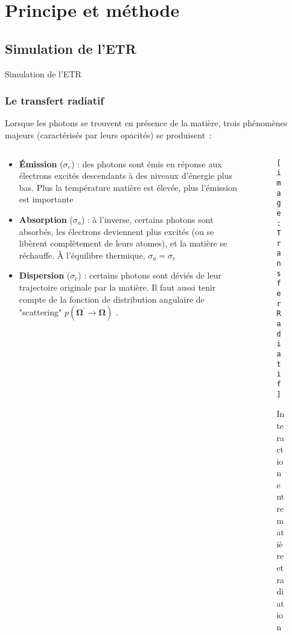 
% 


\section{Principe et méthode}

\subsection{Simulation de l'ETR}

\begin{frame}
  \large
  \centering
  Simulation de l'ETR
\end{frame}

\begin{frame}
  \frametitle{Le transfert radiatif}

  \scriptsize
Lorsque les photons se trouvent en présence de la matière, trois phénomènes majeurs (caractérisés par leurs opacités) se produisent :

\begin{columns}
  \begin{column}{0.55\textwidth}
    \scriptsize
   \begin{itemize}[<+>]
     \item \textbf{Émission} ($\sigma_e$) : des photons sont émis en réponse aux électrons excités descendants à des niveaux d’énergie plus bas. Plus la température matière est élevée, plus l'émission est importante %
     \item \textbf{Absorption} ($\sigma_a$) : à l’inverse, certains photons sont absorbés, les électrons deviennent plus excités (ou se libèrent complètement de leurs atomes), et la matière se réchauffe. À l'équilibre thermique, $\sigma_a = \sigma_e$ %
     \item \textbf{Dispersion} ($\sigma_c$) : certains photons sont déviés de
     leur trajectoire originale par la matière. Il faut aussi tenir compte de la fonction de distribution angulaire de "scattering" $p(\bm{\Omega^\prime \rightarrow \bm{\Omega}})$ \parencite{Reference3}.
   \end{itemize}
  \end{column}
  \begin{column}{0.45\textwidth}
     \begin{figure}       
      \texttt{[image: TransferRadiatif]}       
      \caption{Interaction entre matière et radiation}
    \end{figure}
  \end{column}
 \end{columns}
 
\end{frame}

